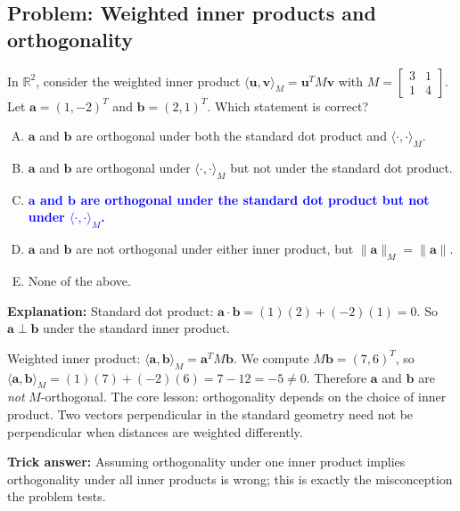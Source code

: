 \documentclass[12pt]{amsart}
\begin{document}
\subsection*{Problem: Weighted inner products and orthogonality}

In $\mathbb{R}^2$, consider the weighted inner product
$\langle \mathbf{u}, \mathbf{v} \rangle_M = \mathbf{u}^T M \mathbf{v}$ with
$M = \begin{bmatrix} 3 & 1 \\ 1 & 4 \end{bmatrix}$.
Let $\mathbf{a} = (1,-2)^T$ and $\mathbf{b} = (2,1)^T$.
Which statement is correct?

\begin{enumerate}[(A)]
\item $\mathbf{a}$ and $\mathbf{b}$ are orthogonal under both the standard dot product and $\langle\cdot,\cdot\rangle_M$.
\item $\mathbf{a}$ and $\mathbf{b}$ are orthogonal under $\langle\cdot,\cdot\rangle_M$ but not under the standard dot product.
\item \textcolor{blue}{\textbf{$\mathbf{a}$ and $\mathbf{b}$ are orthogonal under the standard dot product but not under $\langle\cdot,\cdot\rangle_M$.}}
\item $\mathbf{a}$ and $\mathbf{b}$ are not orthogonal under either inner product, but $\|\mathbf{a}\|_M = \|\mathbf{a}\|$.
\item None of the above.
\end{enumerate}

\textbf{Explanation:}
Standard dot product: $\mathbf{a}\cdot\mathbf{b} = (1)(2)+(-2)(1) = 0$. So $\mathbf{a}\perp\mathbf{b}$
under the standard inner product.

Weighted inner product:
$\langle\mathbf{a},\mathbf{b}\rangle_M = \mathbf{a}^T M\mathbf{b}$.
We compute $M\mathbf{b} = (7,6)^T$, so $\langle\mathbf{a},\mathbf{b}\rangle_M = (1)(7)+(-2)(6) = 7-12=-5\neq 0$.
Therefore $\mathbf{a}$ and $\mathbf{b}$ are \emph{not} $M$-orthogonal.
The core lesson: orthogonality depends on the choice of inner product.
Two vectors perpendicular in the standard geometry need not be perpendicular
when distances are weighted differently.

\textbf{Trick answer:}
Assuming orthogonality under one inner product implies orthogonality under all
inner products is wrong; this is exactly the misconception the problem tests.
\end{document}
